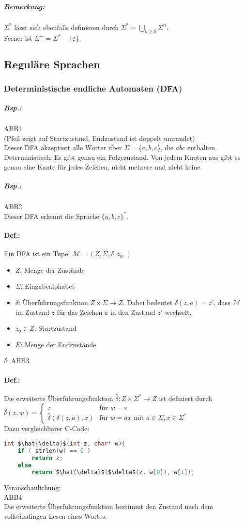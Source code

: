 \subparagraph{Bemerkung:} $\Sigma^*$ lässt sich ebenfalls definieren durch $\Sigma^*=\bigcup_{n\geq 0}\Sigma^n$.\\
Ferner ist $\Sigma^+=\Sigma^*-\{\varepsilon\}$.

\subsection{Reguläre Sprachen}
\subsubsection{Deterministische endliche Automaten (DFA)}
\subparagraph{Bsp.:} \parskp
ABB1\\
(Pfeil zeigt auf Startzustand, Endzustand ist doppelt umrandet)\\
Dieser DFA akzeptiert alle Wörter über $\Sigma = \{a,b,c\}$, die $abc$ enthalten.\\
Deterministisch: Es gibt genau ein Folgezustand. Von jedem Knoten aus gibt es genau eine Kante für jedes Zeichen, nicht mehrere und nicht keine.
\subparagraph{Bsp.:} \parskp
ABB2\\
Dieser DFA erkennt die Sprache $\{a,b,c\}^*$.
\paragraph{Def.:} Ein DFA ist ein Tupel $\mathcal{M}=(Z, \Sigma, \delta, z_0, )$
\begin{itemize}
\item $Z$: Menge der Zustände
\item $\Sigma$: Eingabealphabet
\item $\delta$: Überführungsfunktion $Z\times \Sigma \rightarrow Z$. Dabei bedeutet $\delta (z,a) = z'$, dass $\mathcal{M}$ im Zustand $z$ für das Zeichen $a$ in den Zustand $z'$ wechselt.
\item $z_0\in Z$: Startzustand
\item $E$: Menge der Endzustände
\end{itemize}
$\delta$: ABB3

\paragraph{Def.:} Die erweiterte Überführungsfunktion $\hat{\delta}:Z\times \Sigma^*\rightarrow Z$ ist definiert durch\\
$\hat{\delta}(z,w)=\begin{cases}
z & \text{für }w = \varepsilon\\
\hat{\delta}(\delta(z,a),x) & \text{für }w=ax \text{ mit } a\in \Sigma ,x \in \Sigma^*
\end{cases}$\\
Dazu vergleichbarer C-Code:
\begin{lstlisting}[language=C]
int $\hat{\delta}$(int z, char* w){
	if ( strlen(w) == 0 )
		return z;
	else
		return $\hat{\delta}$($\delta$(z, w[0]), w[1]);
\end{lstlisting}
Veranschaulichung:\\
ABB4\\
Die erweiterte Überführungsfunktion bestimmt den Zustand nach dem vollständingen Lesen eines Wortes.

